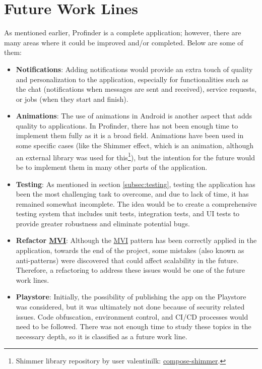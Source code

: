 \section*{Future Work Lines}
As mentioned earlier, Profinder is a complete application; however, there are many areas where it could be improved and/or completed. Below are some of them:
\begin{itemize}
    \item \textbf{Notifications}: Adding notifications would provide an extra touch of quality and personalization to the application, especially for functionalities such as the chat (notifications when messages are sent and received), service requests, or jobs (when they start and finish).
    \item \textbf{Animations}: The use of animations in Android is another aspect that adds quality to applications. In Profinder, there has not been enough time to implement them fully as it is a broad field. Animations have been used in some specific cases (like the Shimmer effect, which is an animation, although an external library was used for this\footnote{Shimmer library repository by user valentinilk: \href{https://github.com/valentinilk/compose-shimmer}{compose-shimmer}.}), but the intention for the future would be to implement them in many other parts of the application.
    \item \textbf{Testing}: As mentioned in section \ref{subsec:testing}, testing the application has been the most challenging task to overcome, and due to lack of time, it has remained somewhat incomplete. The idea would be to create a comprehensive testing system that includes unit tests, integration tests, and UI tests to provide greater robustness and eliminate potential bugs.
    \item \textbf{Refactor \hyperlink{subsec:mvi}{MVI}}: Although the \hyperlink{subsec:mvi}{MVI} pattern has been correctly applied in the application, towards the end of the project, some mistakes (also known as anti-patterns) were discovered that could affect scalability in the future. Therefore, a refactoring to address these issues would be one of the future work lines.
    \item \textbf{Playstore}: Initially, the possibility of publishing the app on the Playstore was considered, but it was ultimately not done because of security related issues. Code obfuscation, environment control, and CI/CD processes would need to be followed. There was not enough time to study these topics in the necessary depth, so it is classified as a future work line.

\end{itemize}
